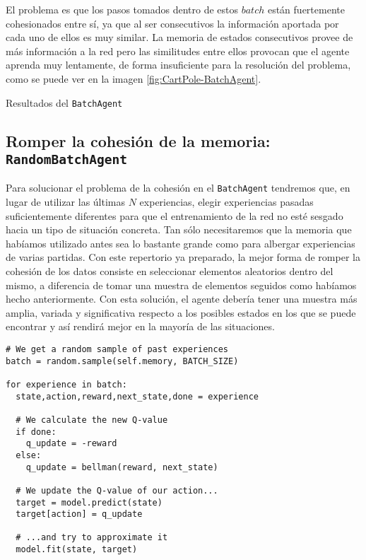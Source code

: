 El problema es que los pasos tomados dentro de estos $batch$ están fuertemente cohesionados entre sí, ya que al ser consecutivos la información aportada por cada uno de ellos es muy similar. La memoria de estados consecutivos provee de más información a la red pero las similitudes entre ellos provocan que el agente aprenda muy lentamente, de forma insuficiente para la resolución del problema, como se puede ver en la imagen \ref{fig:CartPole-BatchAgent}.

%
       {Resultados del \texttt{BatchAgent}}


\subsection{Romper la cohesión de la memoria: \texttt{RandomBatchAgent}}
\label{sec:cartpoledqn3}

Para solucionar el problema de la cohesión en el \texttt{BatchAgent} tendremos que, en lugar de utilizar las últimas $N$ experiencias, elegir experiencias pasadas suficientemente diferentes para que el entrenamiento de la red no esté sesgado hacia un tipo de situación concreta. Tan sólo necesitaremos que la memoria que habíamos utilizado antes sea lo bastante grande como para albergar experiencias de varias partidas. Con este repertorio ya preparado, la mejor forma de romper la cohesión de los datos consiste en seleccionar elementos aleatorios dentro del mismo, a diferencia de tomar una muestra de elementos seguidos como habíamos hecho anteriormente. Con esta solución, el agente debería tener una muestra más amplia, variada y significativa respecto a los posibles estados en los que se puede encontrar y así rendirá mejor en la mayoría de las situaciones.
  
\begin{minipage}{0.9\linewidth}%
\begin{lstlisting}[frame=tb, caption=Pseudocódigo RandomBatchAgent, inputencoding=latin1, label=code:cartpole_drl3]
# We get a random sample of past experiences
batch = random.sample(self.memory, BATCH_SIZE)

for experience in batch:
  state,action,reward,next_state,done = experience

  # We calculate the new Q-value
  if done:
    q_update = -reward
  else:
    q_update = bellman(reward, next_state)

  # We update the Q-value of our action...
  target = model.predict(state)
  target[action] = q_update

  # ...and try to approximate it
  model.fit(state, target)
\end{lstlisting}%
\end{minipage}

